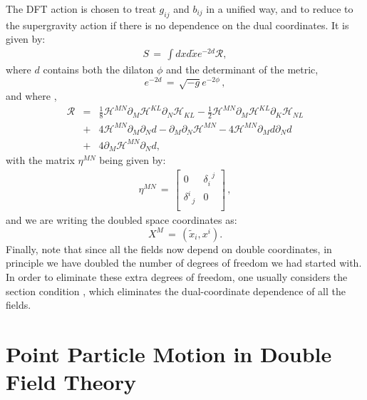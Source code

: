 \documentclass[prd, aps, superscriptaddress, preprintnumbers, twocolumn, floatfix, nofootinbib]{revtex4}
\begin{document}
The DFT action is chosen to treat $g_{ij}$ and
$b_{ij}$ in a unified way, and to reduce to the supergravity action
if there is no dependence on the dual coordinates. It is
given by:
\begin{eqnarray}\label{DFT_action}
S \, = \,  \int dxd\tilde{x} e^{-2d}\mathcal{R},
\end{eqnarray}
where $d$ contains both the dilaton $\phi$ and the determinant of the metric,
\begin{equation}
e^{-2d} \, = \, \sqrt{-g} e^{-2 \phi} \, ,
\end{equation}
and where \cite{Hohm:2010jy},
\begin{eqnarray}
\mathcal{R} & = & \frac{1}{8}\mathcal{H}^{MN}\partial_{M}\mathcal{H}^{KL}\partial_{N}\mathcal{H}_{KL}-\frac{1}{2}\mathcal{H}^{MN}\partial_{M}\mathcal{H}^{KL}\partial_{K}\mathcal{H}_{NL}\nonumber \\
 &+&4\mathcal{H}^{MN}\partial_{M}\partial_{N}d-\partial_{M}\partial_{N}\mathcal{H}^{MN}-4\mathcal{H}^{MN}\partial_{M}d\partial_{N}d\nonumber \\
 &+&4\partial_{M}\mathcal{H}^{MN}\partial_{N}d,
\end{eqnarray}
with the matrix $\eta^{MN}$ being given by:
\begin{eqnarray}
\eta^{MN} \, = \,
\begin{bmatrix}
0 & \delta^{\;\;j}_i \\
\delta^{i}_{\;\;j} & 0\\
\end{bmatrix} \, ,
\end{eqnarray}
and we are writing the doubled space coordinates as:
 \begin{equation}
X^M \, = \,(\tilde{x}_i,x^{i}).
\end{equation}
Finally, note that since all the fields now depend on double coordinates, in principle we have doubled the number of degrees of freedom we had started with. In order to eliminate these extra degrees of freedom, one usually considers the section condition \cite{DFTrev}, which eliminates the dual-coordinate dependence of all the fields.

\section{Point Particle Motion in Double Field Theory}
\end{document}
